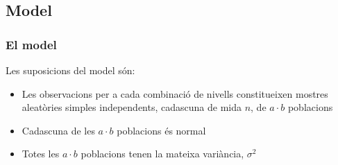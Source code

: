 \documentclass[12pt,t]{beamer}
\theoremstyle{plain}
\theoremstyle{definition}
\begin{document}
%
%
%
%
%
%
%
%


\subsection{Model}


\begin{frame}
\frametitle{El model}

Les suposicions del model són:
\medskip

\begin{itemize}
\item Les observacions per a cada combinació de nivells constitueixen
mostres aleatòries simples independents, cadascuna de mida $n$, de $a\cdot b$
poblacions 
\medskip 

\item Cadascuna de les $a\cdot b$ poblacions és normal
\medskip 

\item Totes les $a\cdot b$ poblacions tenen la mateixa variància,
$\sigma^2$
\end{itemize}
\end{frame}
\end{document}
